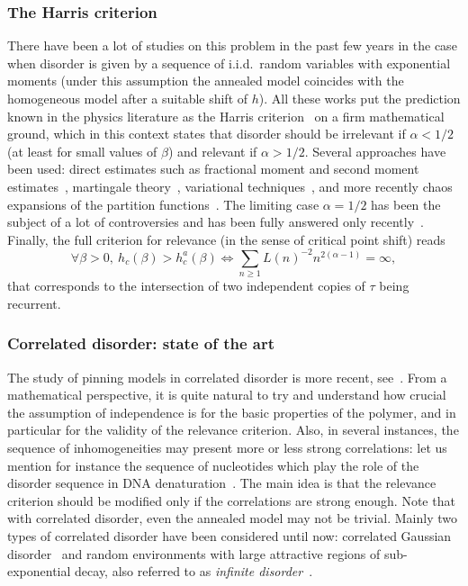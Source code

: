 \documentclass[11pt]{article}
\theoremstyle{definition}
\numberwithin{equation}{section}
\numberwithin{figure}{section}
\numberwithin{table}{section}
\newcommand{\ga}{\alpha}
\newcommand{\gb}{\beta}
\let\oldforall\forall
\renewcommand*{\forall}{\mathrel{\oldforall}}
\begin{document}
\subsubsection{The Harris criterion}

There have been a lot of studies on this problem in the past few years in the case when disorder is given by a sequence of i.i.d.~random variables with exponential moments (under this assumption the annealed model coincides with the homogeneous model after a suitable shift of $h$). All these works put the prediction known in the physics literature as the Harris criterion~\cite{H74} on a firm mathematical ground, which in this context states that disorder should be irrelevant if $\ga < 1/2$ (at least for small values of $\beta$) and relevant if $\ga > 1/2$. Several approaches have been used: direct estimates such as fractional moment and second moment estimates~\cite{AS06, AZ09, BL15, BCPSZ14, CadH13, DGLT09, GiT2006, GTL09}, martingale theory~\cite{L10}, variational techniques~\cite{CdH13}, and more recently chaos expansions of the partition functions~\cite{CSZ16+,CSZ16,CTT16+}. The limiting case $\ga = 1/2$ has been the subject of a lot of controversies and has been fully answered only recently~\cite{BL15}. Finally, the full criterion for relevance (in the sense of critical point shift) reads
\begin{equation}
\forall \gb > 0,\ h_c(\gb) > h_c^a(\gb) \iff \sum_{n \geq 1} L(n)^{- 2} n^{2 (\ga - 1)} = \infty,
\end{equation}
that corresponds to the intersection of two independent copies of $\tau$ being recurrent.

\subsubsection{Correlated disorder: state of the art}

The study of pinning models in correlated disorder is more recent, see~\cite{B13, B14, BL12, BP15, P13}. From a mathematical perspective, it is quite natural to try and understand how crucial the assumption of independence is for the basic properties of the polymer, and in particular for the validity of the relevance criterion. Also, in several instances, the sequence of inhomogeneities may present more or less strong correlations: let us mention for instance the sequence of nucleotides which play the role of the disorder sequence in DNA denaturation~\cite{JPS06}. The main idea is that the relevance criterion should be modified only if the correlations are strong enough. Note that with correlated disorder, even the annealed model may not be trivial. Mainly two types of correlated disorder have been considered until now: correlated Gaussian disorder~\cite{B13, BP15, P13} and random environments with large attractive regions of sub-exponential decay, also referred to as \emph{infinite disorder}~\cite{B14, BL12}.
\end{document}
